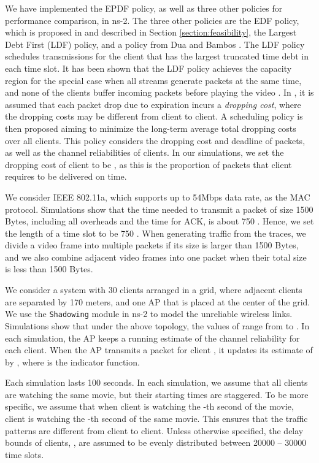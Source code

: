 \documentclass[10pt,nocopyrightspace]{sigplan-proc-varsize-1in}
\begin{document}
We have implemented the EPDF policy, as well as three other policies for performance comparison, in ns-2. The three other policies are the EDF policy, which is proposed in \cite{CLL73} and described in Section \ref{section:feasibility}, the Largest Debt First (LDF) policy, and a policy from Dua and Bambos \cite{AD07}. The LDF policy schedules transmissions for the client that has the largest truncated time debt in each time slot. It has been shown that the LDF policy achieves the capacity region for the special case when all streams generate packets at the same time, and none of the clients buffer incoming packets before playing the video \cite{IH09}\cite{IH09Hoc}. In \cite{AD07}, it is assumed that each packet drop due to expiration incurs a \emph{dropping cost}, where the dropping costs may be different from client to client. A scheduling policy is then proposed aiming to minimize the long-term average total dropping costs over all clients. This policy considers the dropping cost and deadline of packets, as well as the channel reliabilities of clients. In our simulations, we set the dropping cost of client  to be , as this is the proportion of packets that client  requires to be delivered on time.

We consider IEEE 802.11a, which supports up to 54Mbps data rate, as the MAC protocol. Simulations show that the time needed to transmit a packet of size 1500 Bytes, including all overheads and the time for ACK, is about 750 . Hence, we set the length of a time slot to be 750 . When generating traffic from the traces, we divide a video frame into multiple packets if its size is larger than 1500 Bytes, and we also combine adjacent video frames into one packet when their total size is less than 1500 Bytes.

We consider a system with 30 clients arranged in a  grid, where adjacent clients are separated by 170 meters, and one AP that is placed at the center of the grid. We use the \texttt{Shadowing} module in ns-2 to model the unreliable wireless links. Simulations show that under the above topology, the values of  range from  to . In each simulation, the AP keeps a running estimate of the channel reliability for each client. When the AP transmits a packet for client , it updates its estimate of  by , where  is the indicator function.

Each simulation lasts 100 seconds. In each simulation, we assume that all clients are watching the same movie, but their starting times are staggered. To be more specific, we assume that when client  is watching the -th second of the movie, client  is watching the -th second of the same movie. This ensures that the traffic patterns are different from client to client. Unless otherwise specified, the delay bounds of clients, , are assumed to be evenly distributed between 20000 -- 30000 time slots. 
\end{document}
